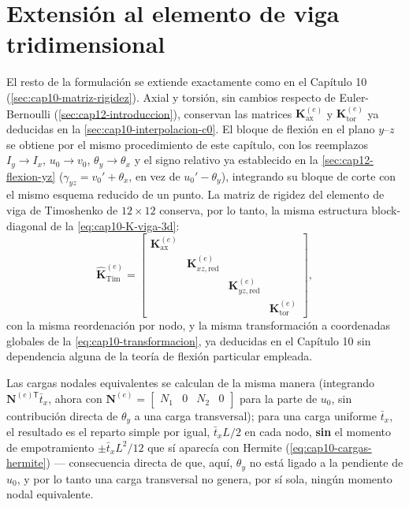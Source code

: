 \section{Extensión al elemento de viga tridimensional}
\label{sec:cap13-extension-3d}

El resto de la formulación se extiende exactamente como en el Capítulo 10 (\cref{sec:cap10-matriz-rigidez}). Axial y torsión, sin cambios respecto de Euler-Bernoulli (\cref{sec:cap12-introduccion}), conservan las matrices $\bm K^{(e)}_{\text{ax}}$ y $\bm K^{(e)}_{\text{tor}}$ ya deducidas en la \cref{sec:cap10-interpolacion-c0}. El bloque de flexión en el plano $y$--$z$ se obtiene por el mismo procedimiento de este capítulo, con los reemplazos $I_y\to I_x$, $u_0\to v_0$, $\theta_y\to\theta_x$ y el signo relativo ya establecido en la \cref{sec:cap12-flexion-yz} ($\gamma_{yz}=v_0'+\theta_x$, en vez de $u_0'-\theta_y$), integrando su bloque de corte con el mismo esquema reducido de un punto. La matriz de rigidez del elemento de viga de Timoshenko de $12\times12$ conserva, por lo tanto, la misma estructura block-diagonal de la \cref{eq:cap10-K-viga-3d}:
\[
\hat{\bm K}^{(e)}_{\text{Tim}} = \begin{bmatrix}
\bm K^{(e)}_{\text{ax}} & & & \\
& \bm K^{(e)}_{xz,\text{red}} & & \\
& & \bm K^{(e)}_{yz,\text{red}} & \\
& & & \bm K^{(e)}_{\text{tor}}
\end{bmatrix} ,
\]
con la misma reordenación por nodo, y la misma transformación a coordenadas globales de la \cref{eq:cap10-transformacion}, ya deducidas en el Capítulo 10 sin dependencia alguna de la teoría de flexión particular empleada.

Las cargas nodales equivalentes se calculan de la misma manera (integrando $\bm N^{(e)\mathsf T}\bar t_x$, ahora con $\bm N^{(e)}=\begin{bmatrix}N_1&0&N_2&0\end{bmatrix}$ para la parte de $u_0$, sin contribución directa de $\theta_y$ a una carga transversal); para una carga uniforme $\bar t_x$, el resultado es el reparto simple por igual, $\bar t_xL/2$ en cada nodo, \textbf{sin} el momento de empotramiento $\pm\bar t_xL^2/12$ que sí aparecía con Hermite (\cref{eq:cap10-cargas-hermite}) --- consecuencia directa de que, aquí, $\theta_y$ no está ligado a la pendiente de $u_0$, y por lo tanto una carga transversal no genera, por sí sola, ningún momento nodal equivalente.

